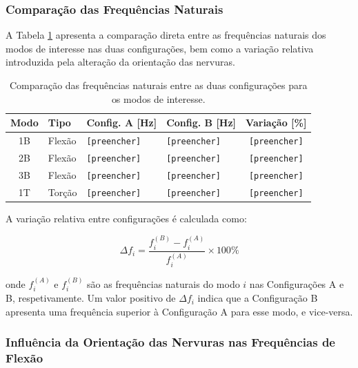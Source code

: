 \documentclass[a4paper,fleqn]{cas-sc}
\begin{document}
\subsubsection{Comparação das Frequências Naturais}

A Tabela \ref{tab:comparacao_freqs} apresenta a comparação direta entre as frequências naturais dos modos de interesse nas duas configurações, bem como a variação relativa introduzida pela alteração da orientação das nervuras.

\begin{table}
\centering
\caption{Comparação das frequências naturais entre as duas configurações para os modos de interesse.}
\label{tab:comparacao_freqs}
\renewcommand{\arraystretch}{1.4}
\begin{tabularx}{\textwidth}{c l X X c} %
\toprule
\textbf{Modo} & \textbf{Tipo} & \textbf{Config. A [\si{\hertz}]} & \textbf{Config. B [\si{\hertz}]} & \textbf{Variação [\%]} \\
\midrule
1B & Flexão & \texttt{[preencher]} & \texttt{[preencher]} & \texttt{[preencher]} \\
2B & Flexão & \texttt{[preencher]} & \texttt{[preencher]} & \texttt{[preencher]} \\
3B & Flexão & \texttt{[preencher]} & \texttt{[preencher]} & \texttt{[preencher]} \\
1T & Torção & \texttt{[preencher]} & \texttt{[preencher]} & \texttt{[preencher]} \\
\bottomrule
\end{tabularx}
\end{table}

A variação relativa entre configurações é calculada como:

\begin{equation}
    \Delta f_i = \frac{f_i^{(B)} - f_i^{(A)}}{f_i^{(A)}} 
    \times 100\%
    \label{eq:variacao_freq}
\end{equation}

\noindent onde $f_i^{(A)}$ e $f_i^{(B)}$ são as frequências naturais do modo $i$ nas Configurações A e B, respetivamente. Um valor positivo de $\Delta f_i$ indica que a Configuração B apresenta uma frequência superior à Configuração A para esse modo, e vice-versa.

\subsubsection{Influência da Orientação das Nervuras nas 
Frequências de Flexão}
\end{document}
